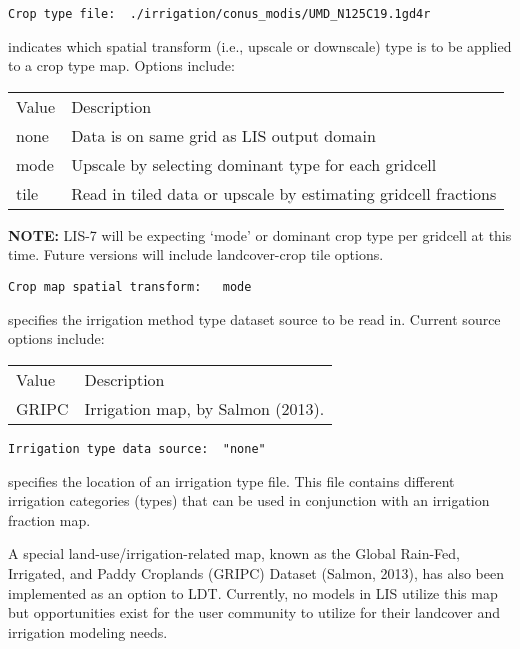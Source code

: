  \begin{Verbatim}[frame=single]
Crop type file:  ./irrigation/conus_modis/UMD_N125C19.1gd4r
 \end{Verbatim}

 
  indicates which spatial transform
 (i.e., upscale or downscale) type is to be applied to a crop type
 map.  Options include:

 \begin{tabular}{ll}
 Value   & Description                                          \\
 none    & Data is on same grid as LIS output domain            \\
 mode    & Upscale by selecting dominant type for each gridcell \\
 tile    & Read in tiled data or upscale by estimating gridcell fractions \\
 \end{tabular}

 \textbf{NOTE:} LIS-7 will be expecting `mode' or dominant crop type per gridcell
    at this time. Future versions will include landcover-crop tile options.

 

 \begin{Verbatim}[frame=single]
Crop map spatial transform:   mode
 \end{Verbatim}


 
  specifies the irrigation method type 
 dataset source to be read in.
 Current source options include:

 \begin{tabular}{ll}
 Value       & Description               \\
 GRIPC       & Irrigation map, by Salmon (2013).  \\
 \end{tabular}
 

 \begin{Verbatim}[frame=single]
Irrigation type data source:  "none"
 \end{Verbatim}

 
  specifies the location of an irrigation
 type file.
 This file contains different irrigation categories (types) that
 can be used in conjunction with an irrigation fraction map.
 
 A special land-use/irrigation-related map, known as the
 Global Rain-Fed, Irrigated, and Paddy Croplands (GRIPC) Dataset
 (Salmon, 2013), has also been implemented as an option to
 LDT.  Currently, no models in LIS utilize this map but 
 opportunities exist for the user community to utilize for their
 landcover and irrigation modeling needs.
 


